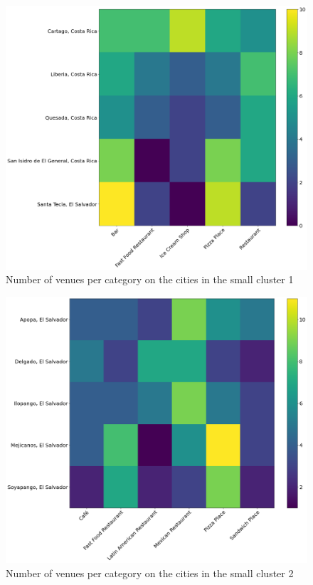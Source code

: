 \documentclass[letterpaper,12pt]{article}
\begin{document}
\begin{figure}[h]
    \centering
    \includegraphics[width=\textwidth]{images/cluster4.png}
    \caption{Number of venues per category on the cities in the small cluster 1}
    \label{fig:cluster_3}
\end{figure}

\begin{figure}[h]
    \centering
    \includegraphics[width=\textwidth]{images/cluster5.png}
    \caption{Number of venues per category on the cities in the small cluster 2}
    \label{fig:cluster_4}
\end{figure}
\end{document}
